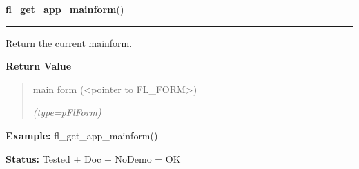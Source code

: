 \hspace{.8\funcindent}\begin{boxedminipage}{\funcwidth}

    \raggedright \textbf{fl\_get\_app\_mainform}()

    \vspace{-1.5ex}

    \rule{\textwidth}{0.5\fboxrule}
\setlength{\parskip}{2ex}
    Return the current mainform.

\setlength{\parskip}{1ex}
      \textbf{Return Value}
    \vspace{-1ex}

      \begin{quote}
      main form ({\textless}pointer to FL\_FORM{\textgreater})

      {\it (type=pFlForm)}

      \end{quote}

\textbf{Example:} fl\_get\_app\_mainform()



\textbf{Status:} Tested + Doc + NoDemo = OK



    \end{boxedminipage}

    \label{xformslib:flbasic:fl_set_app_nomainform}

    \vspace{0.5ex}

